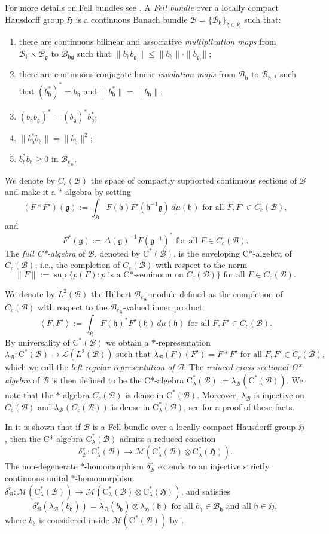 \documentclass[11pt,final]{amsart}
\numberwithin{equation}{section}
\theoremstyle{plain}
\theoremstyle{definition}
\theoremstyle{remark}
\newcommand{\B}{{\mathcal{B}}}
\renewcommand{\L}{{\mathcal{L}}}
\newcommand{\M}{{\mathcal{M}}}
\def\De{\Delta}
\def\de{\delta}
\def\la{\lambda}
\newcommand{\fg}{{\mathfrak{g}}}
\newcommand{\fH}{{\mathfrak{H}}}
\newcommand{\fh}{{\mathfrak{h}}}
\newcommand{\foral}{\text{ for all }}
\newcommand{\ca}{\mathrm{C}^*}
\newcommand{\ol}{\overline}
\newcommand{\sca}[1]{\left\langle#1\right\rangle} %
\begin{document}
For more details on Fell bundles see \cite{Exe17, FD88}.
A \emph{Fell bundle} over a locally compact Hausdorff group $\fH$ is a continuous Banach bundle $\B = \{\B_{\fh}\}_{\fh \in \fH}$ such that:
\begin{enumerate}
\item there are continuous bilinear and associative \emph{multiplication maps} from $\B_{\fh} \times \B_{\fg}$ to $\B_{\fh\fg}$ such that $\|b_{\fh} b_{\fg} \| \leq \|b_{\fh}\| \cdot \|b_{\fg}\|$;
\item there are continuous conjugate linear \emph{involution maps} from $\B_{\fh}$ to $\B_{\fh^{-1}}$ such that $(b_{\fh}^*)^* = b_{\fh}$ and $\|b_{\fh}^*\| = \|b_{\fh}\|$;
\item $(b_{\fh} b_{\fg})^* = (b_{\fg})^* b_{\fh}^*$;
\item $\|b_{\fh}^* b_{\fh}\| = \| b_{\fh}\|^2$;
\item $b_{\fh}^* b_{\fh} \geq 0$ in $\B_{e_\fH}$.
\end{enumerate}

We denote by $C_c(\B)$ the space of compactly supported continuous sections of $\B$ and make it a $*$-algebra by setting
\[
(F \ast F')(\fg):= \int_{\fH} F(\fh) F'(\fh^{-1}\fg) \, d\mu(\fh) \foral F,F'\in C_c(\B),
\]
and
\[
F^*(\fg):=\De(\fg)^{-1} F(\fg^{-1})^* \foral F\in C_c(\B).
\]
The \emph{full C*-algebra} of $\B$, denoted by $\ca(\B)$, is the enveloping C*-algebra of $C_c(\B)$, i.e., the completion of $C_c(\B)$ with respect to the norm 
\[
\|F\|:=\sup\{ p(F): p \text{ is a C*-seminorm on } C_c(\B)\} \foral F\in C_c(\B).
\]

We denote by $L^2(\B)$ the Hilbert $\B_{e_\fH}$-module defined as the completion of $C_c(\B)$ with respect to the $\B_{e_\fH}$-valued inner product 
\[
\sca{F,F'}:=\int_\fH F(\fh)^* F'(\fh) \, d\mu(\fh) \foral F,F' \in C_c(\B).
\]
By universality of $\ca(\B)$ we obtain a $*$-representation
\[
\la_\B \colon \ca(\B) \to \L(L^2(\B)) \text{ such that } \la_\B(F)(F')=F \ast F'\foral F,F' \in C_c(\B),
\]
which we call the \emph{left regular representation of $\B$}. The \emph{reduced cross-sectional C*-algebra} of $\B$ is then defined to be the C*-algebra $\ca_\la(\B):=\la_\B(\ca(\B))$. We note that the $*$-algebra $C_c(\B)$ is dense in $\ca(\B)$. Moreover, $\la_{\B}$ is injective on $C_c(\B)$ and $\la_\B(C_c(\B))$ is dense in $\ca_\la(\B)$, see \cite[Section~2]{EN02} for a proof of these facts.

In \cite[Proposition 2.10]{EN02} it is shown that if $\B$ is a Fell bundle over a locally compact Hausdorff group $\fH$, then the C*-algebra $\ca_{\la}(\B)$ admits a reduced coaction \[
\de_\B^r \colon \ca_\la(\B) \to \M(\ca_\la(\B)\otimes \ca_\la(\fH)).
\]
The non-degenerate $*$-homomorphism $\de_\B^r$ extends to an injective strictly continuous unital $*$-homomorphism $\ol{\de_\B^r} \colon \M(\ca_\la(\B)) \to \M(\ca_\la(\B)\otimes \ca_\la(\fH))$,  and satisfies
\[
\ol{\de_\B^r}(\ol{\la_{\B}}(b_{\fh}))
=
\ol{\la_{\B}}(b_{\fh})\otimes\la_{\fH}(\fh)
\foral  b_{\fh}\in\B_{\fh} \text{ and all } \fh\in \fH,
\]
where $b_{\fh}$ is considered inside $\M(\ca(\B))$ by \cite[Lemma~1.1]{EN02}.
\end{document}
